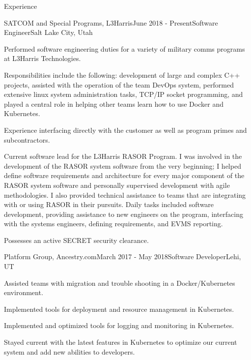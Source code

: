 \documentclass{resume} %
\begin{document}
\begin{rSection}{Experience}

  \begin{rSubsection}{SATCOM and Special Programs, L3Harris}{June 2018 - Present}{Software Engineer}{Salt Lake City, Utah}
  \item Performed software engineering duties for a variety of military comms programs at L3Harris Technologies. 
  \item Responsibilities include the following: development of large and complex C++ projects, assisted with the operation of the team DevOps system, performed extensive linux system administration tasks, TCP/IP socket programming, and played a central role in helping other teams learn how to use Docker and Kubernetes. 
  \item Experience interfacing directly with the customer as well as program primes and subcontractors. 
  \item Current software lead for the L3Harris RASOR Program. I was involved in the development of the RASOR system software from the very beginning; I helped define software requirements and architecture for every major component of the RASOR system software and personally supervised development with agile methodologies. I also provided technical assistance to teams that are integrating with or using RASOR in their pursuits. Daily tasks included software development, providing assistance to new engineers on the program, interfacing with the systems engineers, defining requirements, and EVMS reporting.
  \item Possesses an active SECRET security clearance.
  \end{rSubsection}
  
  \begin{rSubsection}{Platform Group, Ancestry.com}{March 2017 - May 2018}{Software Developer}{Lehi, UT}
  \item Assisted teams with migration and trouble shooting in a Docker/Kubernetes environment.
  \item Implemented tools for deployment and resource management in Kubernetes.
  \item Implemented and optimized tools for logging and monitoring in Kubernetes.
  \item Stayed current with the latest features in Kubernetes to optimize our current system and add new abilities to developers. 
  \end{rSubsection}
  

\end{rSection}
\end{document}

